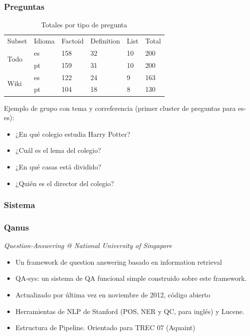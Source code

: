 \begin{frame}
\frametitle{Preguntas}
  \begin{center}
  \begin{table}
  \centering
  \begin{tabular}{| l | l | l | l | l | l |}
  
  Subset & Idioma & Factoid & Definition & List & Total \\ 
  \multirow{2}{*}{Todo} & es & 158 & 32 & 10 & 200 \\ 
   & pt & 159 & 31 & 10 & 200 \\ \hline
   \multirow{2}{*}{Wiki} & es & 122 & 24 & 9 & 163 \\ 
   & pt & 104 & 18 & 8 & 130 \\ 
  \end{tabular}
  \caption{Totales por tipo de pregunta}
  \label{table:totals-type-question}
  \end{table}
  \end{center}

  Ejemplo de grupo con tema y correferencia (primer cluster de preguntas para es-es):
  \begin{itemize}
  \item ¿En qué colegio estudia Harry Potter?
  \item ¿Cuál es el lema del colegio?
  \item ¿En qué casas está dividido?
  \item ¿Quién es el director del colegio?
  \end{itemize}

\end{frame}


\subsubsection*{Sistema}

\begin{frame}[<+->]
\frametitle{Qanus}
  \textit{Question-Answering @ National University of Singapore}
  \begin{itemize}
    \item Un framework de question answering basado en information retrieval
    \item QA-sys: un sistema de QA funcional simple construido sobre este framework. 
    \item Actualizado por última vez en noviembre de 2012, código abierto
    \item Herramientas de NLP de Stanford (POS, NER y QC, para inglés) y Lucene. 
    \item Estructura de Pipeline. Orientado para TREC 07 (Aquaint)
  \end{itemize}
\end{frame}

